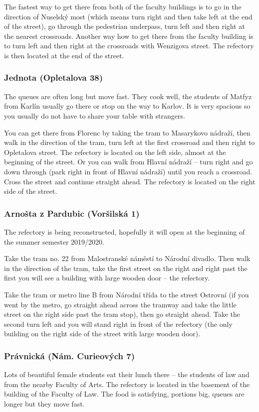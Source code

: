 The fastest way to get there from both of the faculty buildings is to go in the
direction of Nuselský most (which means turn right and then take left at the end
of the street), go through the pedestrian underpass, turn left and then right at
the nearest crossroads.
Another way how to get there from the faculty building is to turn left and then
right at the crossroads with Wenzigova street. The refectory is then located at
the end of the street.


\subsubsection{Jednota (Opletalova 38)}
The queues are often long but move fast. They cook well, the students of Matfyz
from Karlín usually go there or stop on the way to Karlov.
It is very spacious so you usually do not have to share your table with
strangers.

You can get there from Florenc by taking the tram to Masarykovo nádraží, then
walk in the direction of the tram, turn left at the first crossroad and then
right to Opletalova street. The refectory is located on the left side, almost at
the beginning of the street.
Or you can walk from Hlavní nádraží -- turn right and go down through
 (park right in front of Hlavní nádraží) until you reach a crossroad.
Cross the street and continue straight ahead. The refectory is located on the
right side of the street.


\subsubsection{Arnošta z Pardubic (Voršilská 1)}
The refectory is being reconstructed, hopefully it will open at the beginning of
the summer semester 2019/2020.

Take the tram no. 22 from Malostranské náměstí to Národní divadlo. Then walk in
the direction of the tram, take the first street on the right and right past the
first  you will see a building with large wooden door -- the
refectory.

Take the tram or metro line B from Národní třída to the street Ostrovní (if you
went by the metro, go straight ahead across the tramway and take the little
street on the right side past the tram stop), then go straight ahead. Take the
second turn left and you will stand right in front of the refectory (the only
building on the right side of the street with large wooden door).


\subsubsection{Právnická (Nám. Curieových 7)}
Lots of beautiful female students eat their lunch there -- the students of law
and from the nearby Faculty of Arts. The refectory is located in the basement of
the building of the Faculty of Law. The food is satisfying, portions big, queues
are longer but they move fast.

